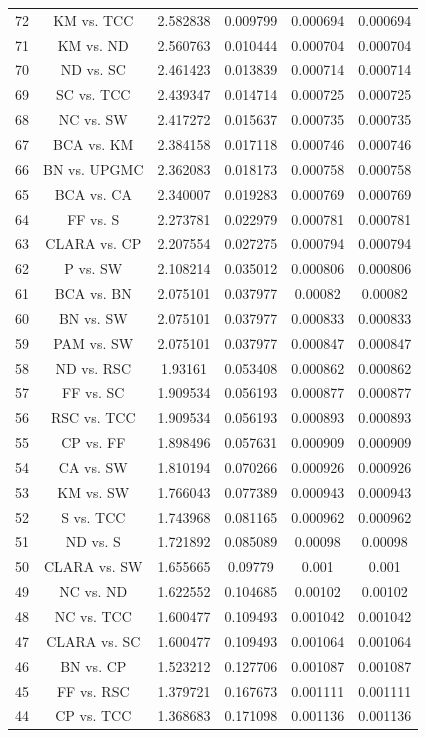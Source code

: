 \documentclass[a4paper,10pt]{article}
\begin{document}
\begin{landscape}
\begin{table}[!htp]
\begin{tabular}{cccccc}
72&KM vs. TCC&2.582838&0.009799&0.000694&0.000694\\
71&KM vs. ND&2.560763&0.010444&0.000704&0.000704\\
70&ND vs. SC&2.461423&0.013839&0.000714&0.000714\\
69&SC vs. TCC&2.439347&0.014714&0.000725&0.000725\\
68&NC vs. SW&2.417272&0.015637&0.000735&0.000735\\
67&BCA vs. KM&2.384158&0.017118&0.000746&0.000746\\
66&BN vs. UPGMC&2.362083&0.018173&0.000758&0.000758\\
65&BCA vs. CA&2.340007&0.019283&0.000769&0.000769\\
64&FF vs. S&2.273781&0.022979&0.000781&0.000781\\
63&CLARA vs. CP&2.207554&0.027275&0.000794&0.000794\\
62&P vs. SW&2.108214&0.035012&0.000806&0.000806\\
61&BCA vs. BN&2.075101&0.037977&0.00082&0.00082\\
60&BN vs. SW&2.075101&0.037977&0.000833&0.000833\\
59&PAM vs. SW&2.075101&0.037977&0.000847&0.000847\\
58&ND vs. RSC&1.93161&0.053408&0.000862&0.000862\\
57&FF vs. SC&1.909534&0.056193&0.000877&0.000877\\
56&RSC vs. TCC&1.909534&0.056193&0.000893&0.000893\\
55&CP vs. FF&1.898496&0.057631&0.000909&0.000909\\
54&CA vs. SW&1.810194&0.070266&0.000926&0.000926\\
53&KM vs. SW&1.766043&0.077389&0.000943&0.000943\\
52&S vs. TCC&1.743968&0.081165&0.000962&0.000962\\
51&ND vs. S&1.721892&0.085089&0.00098&0.00098\\
50&CLARA vs. SW&1.655665&0.09779&0.001&0.001\\
49&NC vs. ND&1.622552&0.104685&0.00102&0.00102\\
48&NC vs. TCC&1.600477&0.109493&0.001042&0.001042\\
47&CLARA vs. SC&1.600477&0.109493&0.001064&0.001064\\
46&BN vs. CP&1.523212&0.127706&0.001087&0.001087\\
45&FF vs. RSC&1.379721&0.167673&0.001111&0.001111\\
44&CP vs. TCC&1.368683&0.171098&0.001136&0.001136\\

\end{tabular}
\end{table}
\end{landscape}
\end{document}
